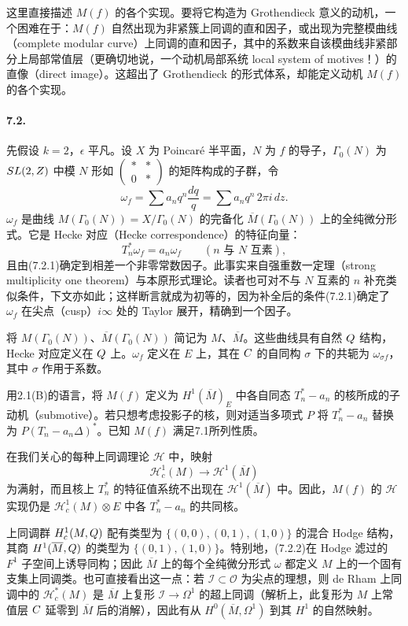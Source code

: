 这里直接描述 $M(f)$ 的各个实现。要将它构造为 Grothendieck 意义的动机，一个困难在于：$M(f)$ 自然出现为非紧簇上同调的直和因子，或出现为完整模曲线（complete modular curve）上同调的直和因子，其中的系数来自该模曲线非紧部分上局部常值层（更确切地说，一个动机局部系统 local system of motives！）的直像（direct image）。这超出了 Grothendieck 的形式体系，却能定义动机 $M(f)$ 的各个实现。

\paragraph*{7.2.}
先假设 $k=2$，$\epsilon$ 平凡。设 $X$ 为 Poincaré 半平面，$N$ 为 $f$ 的导子，$\Gamma_0(N)$ 为 $SL(2,Z)$ 中模 $N$ 形如 $\left(\begin{smallmatrix}*&*\\0&*\end{smallmatrix}\right)$ 的矩阵构成的子群，令
\[
 \omega_f=\sum a_nq^n\frac{dq}{q}=\sum a_nq^n\,2\pi i\,dz.
\]
$\omega_f$ 是曲线 $M(\Gamma_0(N))=X/\Gamma_0(N)$ 的完备化 $\overline M(\Gamma_0(N))$ 上的全纯微分形式。它是 Hecke 对应（Hecke correspondence）的特征向量：
\[
 T_n^*\omega_f=a_n\omega_f\qquad(n\text{ 与 }N\text{ 互素}),\tag{7.2.1}
\]
且由(7.2.1)确定到相差一个非零常数因子。此事实来自强重数一定理（strong multiplicity one theorem）与本原形式理论。读者也可对不与 $N$ 互素的 $n$ 补充类似条件，下文亦如此；这样断言就成为初等的，因为补全后的条件(7.2.1)确定了 $\omega_f$ 在尖点（cusp）$i\infty$ 处的 Taylor 展开，精确到一个因子。

将 $M(\Gamma_0(N))$、$\overline M(\Gamma_0(N))$ 简记为 $M$、$\overline M$。这些曲线具有自然 $Q$ 结构，Hecke 对应定义在 $Q$ 上。$\omega_f$ 定义在 $E$ 上，其在 $C$ 的自同构 $\sigma$ 下的共轭为 $\omega_{\sigma f}$，其中 $\sigma$ 作用于系数。

用2.1(B)的语言，将 $M(f)$ 定义为 $H^1(\overline M)_E$ 中各自同态 $T_n^*-a_n$ 的核所成的子动机（submotive）。若只想考虑投影子的核，则对适当多项式 $P$ 将 $T_n^*-a_n$ 替换为 $P(T_n-a_n\Delta)^*$。已知 $M(f)$ 满足7.1所列性质。

在我们关心的每种上同调理论 $\mathcal H$ 中，映射
\[
 \mathcal H_c^1(M)\longrightarrow\mathcal H^1(\overline M)\tag{7.2.2}
\]
为满射，而且核上 $T_n^*$ 的特征值系统不出现在 $\mathcal H^1(\overline M)$ 中。因此，$M(f)$ 的 $\mathcal H$ 实现仍是 $\mathcal H_c^1(M)\otimes E$ 中各 $T_n^*-a_n$ 的共同核。

上同调群 $H_c^1(M,Q)$ 配有类型为 $\{(0,0),(0,1),(1,0)\}$ 的混合 Hodge 结构，其商 $H^1(\overline M,Q)$ 的类型为 $\{(0,1),(1,0)\}$。特别地，(7.2.2)在 Hodge 滤过的 $F^1$ 子空间上诱导同构；因此 $\overline M$ 上的每个全纯微分形式 $\omega$ 都定义 $M$ 上的一个固有支集上同调类。也可直接看出这一点：若 $\mathcal I\subset\mathcal O$ 为尖点的理想，则 de Rham 上同调中的 $\mathcal H_c^*(M)$ 是 $\overline M$ 上复形 $\mathcal I\longrightarrow\Omega^1$ 的超上同调（解析上，此复形为 $M$ 上常值层 $C$ 延零到 $\overline M$ 后的消解），因此有从 $H^0(\overline M,\Omega^1)$ 到其 $H^1$ 的自然映射。

